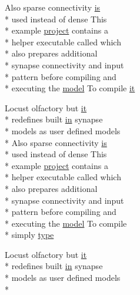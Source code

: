 \begin{DoxyCompactItemize}
Also sparse connectivity \hyperlink{userproject_2MBody__userdef__project_2README_8txt_a7b4e6cf78d14ce882cb8ff127e01babd}{is} \\*
used instead of dense This \\*
example \hyperlink{userproject_2SynDelay__project_2README_8txt_a762c750134e07a31b7965860fd292b51}{project} contains a \\*
helper executable called which \\*
also prepares additional \\*
synapse connectivity and input \\*
pattern before compiling and \\*
executing the \hyperlink{README_8txt_a69fd801b7213948c12d9dd7eebb3ed14}{model} To compile \hyperlink{userproject_2MBody__userdef__project_2README_8txt_a9040a95c25c3aa700dee73c714f011d2}{it}
\item 
Locust olfactory but \hyperlink{userproject_2PoissonIzh__project_2README_8txt_a3e3bbb6c9b14c38757cf273a117e43e8}{it} \\*
redefines built \hyperlink{README_8txt_a148897a6b2cc9cff25af80abb13426b0}{in} synapse \\*
models as user defined models \\*
Also sparse connectivity \hyperlink{userproject_2MBody__userdef__project_2README_8txt_a7b4e6cf78d14ce882cb8ff127e01babd}{is} \\*
used instead of dense This \\*
example \hyperlink{userproject_2SynDelay__project_2README_8txt_a762c750134e07a31b7965860fd292b51}{project} contains a \\*
helper executable called which \\*
also prepares additional \\*
synapse connectivity and input \\*
pattern before compiling and \\*
executing the \hyperlink{README_8txt_a69fd801b7213948c12d9dd7eebb3ed14}{model} To compile \\*
simply \hyperlink{userproject_2MBody__userdef__project_2README_8txt_acaf447a9193df13892d14867971923d5}{type}
\item 
Locust olfactory but \hyperlink{userproject_2PoissonIzh__project_2README_8txt_a3e3bbb6c9b14c38757cf273a117e43e8}{it} \\*
redefines built \hyperlink{README_8txt_a148897a6b2cc9cff25af80abb13426b0}{in} synapse \\*
models as user defined models \\*

\end{DoxyCompactItemize}
